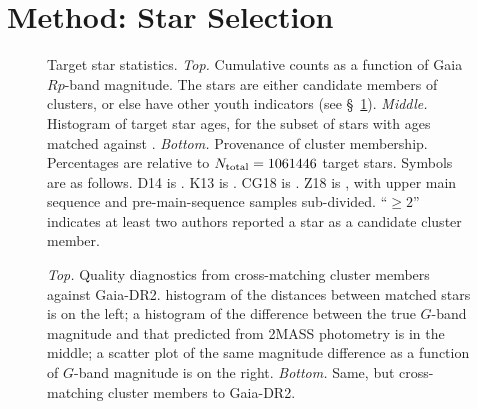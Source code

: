 \documentclass[12pt,twocolumn,tighten]{aastex62}
\begin{document}
\section{Method: Star Selection}
\label{sec:starselection}

\begin{figure}[!t]
	\begin{center}
		\leavevmode
		\vspace{-0.8cm}
		\vspace{-0.8cm}
	\end{center}
	\vspace{-0.8cm}
	\caption{
		Target star statistics.
		{\it Top.} Cumulative counts as a function of Gaia $Rp$-band
		magnitude.  The stars are either candidate members of clusters, or
		else have other youth indicators (see \S~\ref{sec:starselection}).
		{\it Middle.} Histogram of target star ages, for the subset of
		stars with ages matched against \citet{Kharchenko_et_al_2013}.
		{\it Bottom.} Provenance of cluster membership.  Percentages are
		relative to $N_{\rm total}=1061446$ target stars. Symbols
		are as follows.
		D14 is \citet{dias_proper_2014}.
		K13 is \citet{Kharchenko_et_al_2013}.
		CG18 is \citet{cantat-gaudin_gaia_2018}.
		Z18 is \citet{zari_3d_2018}, with upper main sequence and
		pre-main-sequence samples sub-divided.
		``$\geq 2$'' indicates at least two authors reported a star as a
		candidate cluster member.
		\label{fig:cdips_targets}
	}
\end{figure}

\begin{figure}[!t]
	\vspace{-0.8cm}
	\vspace{-0.8cm}
	\caption{
		{\it Top.} Quality diagnostics from cross-matching
		\cite{Kharchenko_et_al_2013} cluster members against Gaia-DR2.
		histogram of the distances between matched stars is on the left; a
		histogram of the difference between the true $G$-band magnitude
		and that predicted from 2MASS photometry is in the middle; a scatter
		plot of the same magnitude difference as a function of $G$-band
		magnitude is on the right.
		{\it Bottom.} Same, but cross-matching \cite{dias_proper_2014}
		cluster members to Gaia-DR2.
	}
	\label{fig:xmatch_info}
\end{figure}
\end{document}
